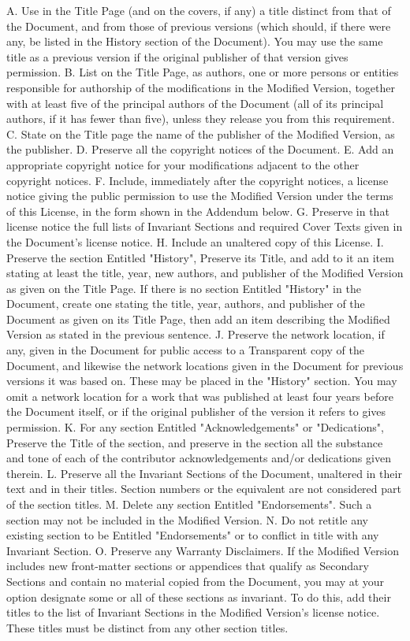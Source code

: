 \documentclass[10pt,a4paper]{article}
\begin{document}
\begin{scriptsize}
A. Use in the Title Page (and on the covers, if any) a title distinct from that of the Document, and from those of previous versions (which should, if there were any, be listed in the History section of the Document). You may use the same title as a previous version if the original publisher of that version gives permission.
B. List on the Title Page, as authors, one or more persons or entities responsible for authorship of the modifications in the Modified Version, together with at least five of the principal authors of the Document (all of its principal authors, if it has fewer than five), unless they release you from this requirement.
C. State on the Title page the name of the publisher of the Modified Version, as the publisher.
D. Preserve all the copyright notices of the Document.
E. Add an appropriate copyright notice for your modifications adjacent to the other copyright notices.
F. Include, immediately after the copyright notices, a license notice giving the public permission to use the Modified Version under the terms of this License, in the form shown in the Addendum below.
G. Preserve in that license notice the full lists of Invariant Sections and required Cover Texts given in the Document's license notice.
H. Include an unaltered copy of this License.
I. Preserve the section Entitled "History", Preserve its Title, and add to it an item stating at least the title, year, new authors, and publisher of the Modified Version as given on the Title Page. If there is no section Entitled "History" in the Document, create one stating the title, year, authors, and publisher of the Document as given on its Title Page, then add an item describing the Modified Version as stated in the previous sentence.
J. Preserve the network location, if any, given in the Document for public access to a Transparent copy of the Document, and likewise the network locations given in the Document for previous versions it was based on. These may be placed in the "History" section. You may omit a network location for a work that was published at least four years before the Document itself, or if the original publisher of the version it refers to gives permission.
K. For any section Entitled "Acknowledgements" or "Dedications", Preserve the Title of the section, and preserve in the section all the substance and tone of each of the contributor acknowledgements and/or dedications given therein.
L. Preserve all the Invariant Sections of the Document, unaltered in their text and in their titles. Section numbers or the equivalent are not considered part of the section titles.
M. Delete any section Entitled "Endorsements". Such a section may not be included in the Modified Version.
N. Do not retitle any existing section to be Entitled "Endorsements" or to conflict in title with any Invariant Section.
O. Preserve any Warranty Disclaimers.
If the Modified Version includes new front-matter sections or appendices that qualify as Secondary Sections and contain no material copied from the Document, you may at your option designate some or all of these sections as invariant. To do this, add their titles to the list of Invariant Sections in the Modified Version's license notice. These titles must be distinct from any other section titles.


\end{scriptsize}
\end{document}
